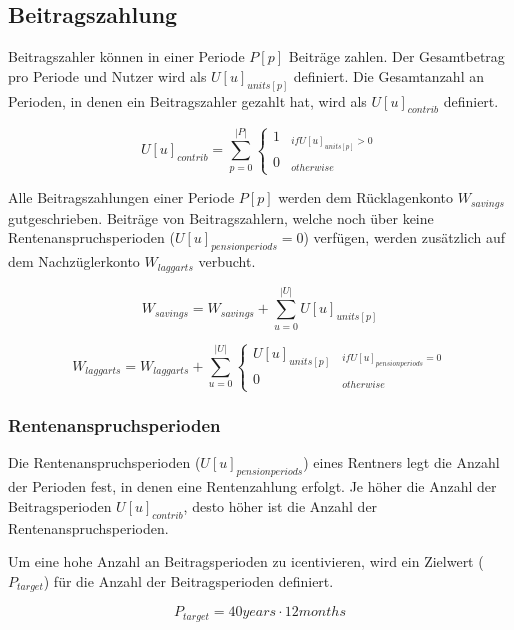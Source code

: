 \subsection{Beitragszahlung}

Beitragszahler können in einer Periode $P[p]$ Beiträge zahlen. Der Gesamtbetrag pro Periode und Nutzer wird als $U[u]_{units[p]}$ definiert. Die Gesamtanzahl an Perioden, in denen ein Beitragszahler gezahlt hat, wird als $U[u]_{contrib}$ definiert.

\begin{equation}
U[u]_{contrib} = \sum_{p=0}^{|P|} \begin{cases} 
1 & _{if U[u]_{units[p]} > 0} \\
0 & _{otherwise}
\end{cases}
\end{equation}


Alle Beitragszahlungen einer Periode $P[p]$ werden dem Rücklagenkonto  $W_{savings}$ gutgeschrieben.
Beiträge von Beitragszahlern, welche noch über keine Rentenanspruchsperioden ($U[u]_{pensionperiods} = 0$) verfügen, werden zusätzlich auf dem Nachzüglerkonto $W_{laggarts}$ verbucht.

\begin{equation}
W_{savings} = W_{savings} + \sum_{u=0}^{|U|} U[u]_{units[p]}
\end{equation}


\begin{dmath}
W_{laggarts} = W_{laggarts} + \sum_{u=0}^{|U|} \begin{cases} 
U[u]_{units[p]} & _{if U[u]_{pensionperiods} = 0} \\
0 & _{otherwise}
\end{cases}
\end{dmath}

\subsubsection*{Rentenanspruchsperioden}
Die Rentenanspruchsperioden ($U[u]_{pensionperiods}$) eines Rentners legt die Anzahl der Perioden fest,
in denen eine Rentenzahlung erfolgt. Je höher die Anzahl der Beitragsperioden
$U[u]_{contrib}$, desto höher ist die Anzahl der Rentenanspruchsperioden.

Um eine hohe Anzahl an Beitragsperioden zu icentivieren, wird ein Zielwert ($P_{target}$)
für die Anzahl der Beitragsperioden definiert. 

\begin{equation}
	P_{target} = 40 years \cdot 12 months
\end{equation}

